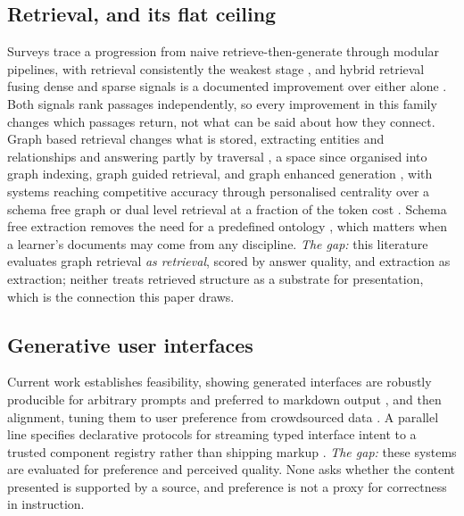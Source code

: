 \documentclass[conference]{IEEEtran}
\begin{document}
\subsection{Retrieval, and its flat ceiling}
Surveys trace a progression from naive retrieve-then-generate through modular pipelines, with retrieval consistently the weakest stage \cite{ref:gao}, and hybrid retrieval fusing dense and sparse signals is a documented improvement over either alone \cite{ref:hybridrag}. Both signals rank passages independently, so every improvement in this family changes which passages return, not what can be said about how they connect. Graph based retrieval changes what is stored, extracting entities and relationships and answering partly by traversal \cite{ref:edge}, a space since organised into graph indexing, graph guided retrieval, and graph enhanced generation \cite{ref:han}, with systems reaching competitive accuracy through personalised centrality over a schema free graph \cite{ref:hipporag} or dual level retrieval at a fraction of the token cost \cite{ref:lightrag}. Schema free extraction removes the need for a predefined ontology \cite{ref:edc}, which matters when a learner's documents may come from any discipline. \emph{The gap:} this literature evaluates graph retrieval \emph{as retrieval}, scored by answer quality, and extraction as extraction; neither treats retrieved structure as a substrate for presentation, which is the connection this paper draws.

\subsection{Generative user interfaces}
Current work establishes feasibility, showing generated interfaces are robustly producible for arbitrary prompts and preferred to markdown output \cite{ref:leviathan}, and then alignment, tuning them to user preference from crowdsourced data \cite{ref:alignui,ref:crowdgenui}. A parallel line specifies declarative protocols for streaming typed interface intent to a trusted component registry rather than shipping markup \cite{ref:a2ui}. \emph{The gap:} these systems are evaluated for preference and perceived quality. None asks whether the content presented is supported by a source, and preference is not a proxy for correctness in instruction.
\end{document}
